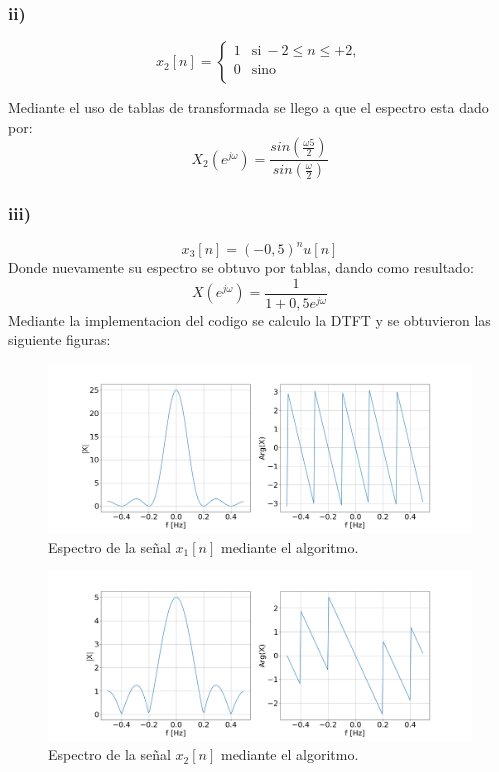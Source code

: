 \documentclass[letterpaper]{article}
\begin{document}
\subsubsection*{ii)}
\begin{equation} 
    x_{2}[n] = \left\{ 
    \begin{array}{ll} 
    1 & \mathrm{si\ } -2\leq n \leq +2, \\
    0 & \mathrm{sino\ } \\
    \end{array} 
    \right.
\end{equation}

Mediante el uso de tablas de transformada se llego a que el espectro esta dado por:
\begin{equation}
X_{2}(e^{j \omega})= \frac{sin(\frac{ \omega 5}{2})}{sin (\frac{\omega}{2})}
\end{equation}

\subsubsection*{iii)}
\begin{equation} 
    x_{3}[n]=(-0,5)^{n}u[n]
\end{equation}
Donde nuevamente su espectro se obtuvo por tablas, dando como resultado:
\begin{equation}
X(e^{j \omega})=\frac{1}{1+0,5 e^{j \omega}}
\end{equation}
Mediante la implementacion del codigo se calculo la DTFT y se obtuvieron las siguiente figuras:
\begin{figure}[H]
\centering
\includegraphics[width=\textwidth]{Img/punto_3_e_1.png}
\caption{Espectro de la señal $x_{1}[n]$ mediante el algoritmo.}
\label{fig.3ei}
\end{figure}

\begin{figure}[H]
\centering
\includegraphics[width=\textwidth]{Img/punto_3_e_2.png}
\caption{Espectro de la señal $x_{2}[n]$ mediante el algoritmo.}
\label{fig.3eii}
\end{figure}
\end{document}
